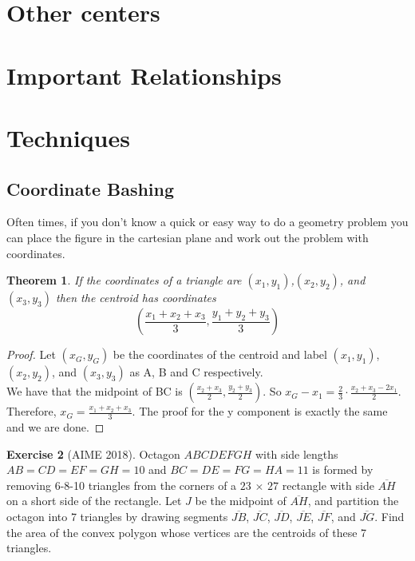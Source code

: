 \documentclass[letterpaper]{article}
\theoremstyle{plain}
\newtheorem{thm}{Theorem}[section]
\theoremstyle{definition}
\newtheorem{exercise}[thm]{Exercise}
\theoremstyle{remark}
\begin{document}
\section{Other centers}
\section{Important Relationships}
\section{Techniques}
    \subsection{Coordinate Bashing}
    Often times, if you don't know a quick or easy way to do a geometry problem you can place the figure in the cartesian plane and work out the problem with coordinates.
    \begin{mdframed}
        \begin{thm}
            If the coordinates of a triangle are $(x_1,y_1)$,$(x_2,y_2)$, and $(x_3,y_3)$ then the centroid has coordinates $$\left(\frac{x_1+x_2+x_3}{3},\frac{y_1+y_2+y_3}{3}\right)$$
        \end{thm}
        
    \end{mdframed}
    \begin{proof}
        Let $(x_G,y_G)$ be the coordinates of the centroid and label $(x_1,y_1)$,$(x_2,y_2)$, and $(x_3,y_3)$ as A, B and C respectively.
        \\We have that the midpoint of BC is $\left(\frac{x_2+x_3}{2},\frac{y_2+y_3}{2}\right)$. So $x_G-x_1=\frac{2}{3}\cdot\frac{x_2+x_3-2x_1}{2}$.
        Therefore, $x_G = \frac{x_1+x_2+x_3}{3}$. The proof for the y component is exactly the same and we are done.
         
    \end{proof}
    \begin{exercise}[AIME 2018]
        Octagon $ABCDEFGH$ with side lengths $AB = CD = EF = GH = 10$ and $BC = DE = FG = HA = 11$ is formed by removing 6-8-10 triangles from the corners of a $23$ $\times$ $27$ rectangle with side $\overline{AH}$ on a short side of the rectangle. Let $J$ be the midpoint of $\overline{AH}$, and partition the octagon into 7 triangles by drawing segments $\overline{JB}$, $\overline{JC}$, $\overline{JD}$, $\overline{JE}$, $\overline{JF}$, and $\overline{JG}$. Find the area of the convex polygon whose vertices are the centroids of these 7 triangles.
    \end{exercise}
\end{document}
